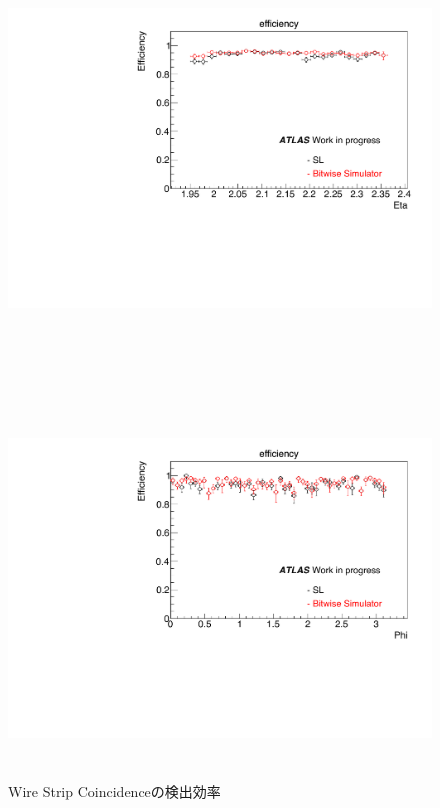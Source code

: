 \begin{figure}
    \begin{minipage}[b]{\linewidth}
    \centering
    \includegraphics[height=10cm]{fig/Test/A_SM_ws_eta.pdf}
    \end{minipage}\\
    \begin{minipage}[b]{\linewidth}
    \centering
    \includegraphics[height=10cm]{fig/Test/A_SM_ws_phi.pdf}
    \end{minipage}%
    \caption[Wire Strip Coincidenceの検出効率]{Wire Strip Coincidenceの検出効率}
    \label{SM_A_WS}
\end{figure}

